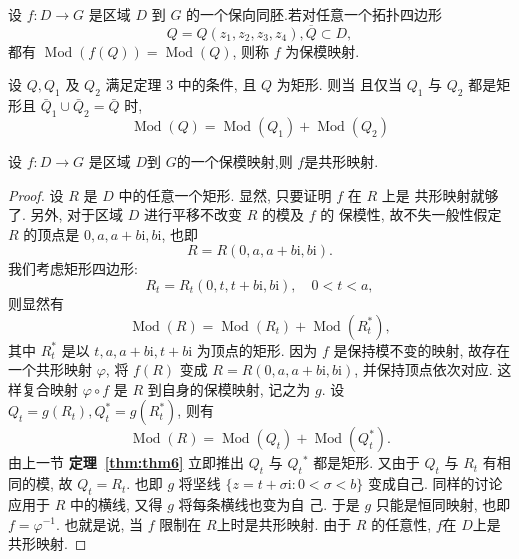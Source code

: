 \begin{defi}[保模映射]\label{def: 保模映射}
    设 $f\colon D\to G$ 是区域 $D$ 到 $G$ 的一个保向同胚.若对任意一个拓扑四边形
    \[Q=Q(z_1,z_2,z_3,z_4),\overline{Q}\subset D,\]
    都有 $\operatorname{Mod}(f(Q))=\operatorname{Mod}(Q)$, 则称 $f$ 为保模映射.
\end{defi}
\begin{thm}\label{thm:thm6}
    设 $Q, Q_1$ 及 $Q_2$ 满足定理 3 中的条件, 且 $Q$ 为矩形. 则当
且仅当 $Q_1$ 与 $Q_2$ 都是矩形且 $\bar{Q}_1 \cup \bar{Q}_2=\bar{Q}$ 时,
$$
\operatorname{Mod}(Q)=\operatorname{Mod}\left(Q_1\right)+\operatorname{Mod}\left(Q_2\right)
$$
\end{thm}
\begin{thm}
    设 $f\colon D\to G$ 是区域 $D$到 $G$的一个保模映射,则 $f$是共形映射. 
\end{thm}
\begin{proof}
    设 $R$ 是 $D$ 中的任意一个矩形. 显然, 只要证明 $f$ 在 $R$ 上是 共形映射就够了. 另外, 对于区域 $D$ 进行平移不改变 $R$ 的模及 $f$ 的 保模性, 故不失一般性假定 $R$ 的顶点是 $0, a, a+b \mathrm{i}, b \mathrm{i}$, 也即
$$
R=R(0, a, a+b \mathrm{i}, b \mathrm{i}) .
$$
我们考虑矩形四边形:
$$
R_t=R_t(0, t, t+b \mathrm{i}, b \mathrm{i}), \quad 0<t<a,
$$
则显然有
$$
\operatorname{Mod}(R)=\operatorname{Mod}\left(R_t\right)+\operatorname{Mod}\left(R_t^*\right),
$$
其中 $R_t^*$ 是以 $t, a, a+b \mathrm{i}, t+b \mathrm{i}$ 为顶点的矩形.
因为 $f$ 是保持模不变的映射, 故存在一个共形映射 $\varphi$, 将 $f(R)$ 变成 $R=R(0, a, a+b \mathrm{i}, b \mathrm{i})$, 并保持顶点依次对应. 这样复合映射 $\varphi \circ f$ 是 $R$ 到自身的保模映射, 记之为 $g$.
设 $Q_t=g\left(R_t\right), Q_t^*=g\left(R_t^*\right)$, 则有
$$
\operatorname{Mod}(R)=\operatorname{Mod}\left(Q_t\right)+\operatorname{Mod}\left(Q_t^*\right) .
$$
由上一节 \textbf{定理~\ref{thm:thm6}} 立即推出 $Q_t$ 与 $Q_t{ }^*$ 都是矩形. 又由于 $Q_t$ 与 $R_t$ 有相 同的模, 故 $Q_t=R_t$. 也即 $g$ 将坚线 $\{z=t+\sigma \mathrm{i}: 0<\sigma<b\}$ 变成自己.
同样的讨论应用于 $R$ 中的横线, 又得 $g$ 将每条横线也变为自
己. 于是 $g$ 只能是恒同映射, 也即 $f=\varphi^{-1}$. 也就是说, 当 $f$ 限制在 $R$上时是共形映射. 由于 $R$ 的任意性, $f$在 $D$上是共形映射.
\end{proof}
